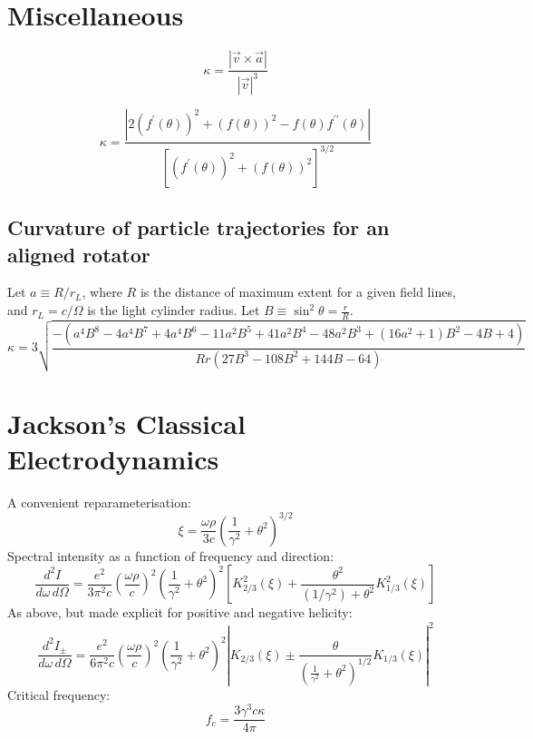 \documentclass[twocolumn]{article}
\begin{document}
\section{Miscellaneous}

\begin{equation}
    \kappa = \frac{|\vec{v}\times\vec{a}|}{|\vec{v}|^3}
\end{equation}

\begin{equation}
    \kappa = \frac{|2(f^\prime(\theta))^2 + (f(\theta))^2 - f(\theta)f^{\prime\prime}(\theta)|}{\left[(f^\prime(\theta))^2 + (f(\theta))^2\right]^{3/2}}
\end{equation}

\onecolumn

\subsection{Curvature of particle trajectories for an aligned rotator}

Let $a \equiv R/r_L$, where $R$ is the distance of maximum extent for a given field lines, and $r_L = c/\Omega$ is the light cylinder radius.
Let $B \equiv \sin^2\theta = \frac{r}{R}$.
\begin{equation}
    \kappa = 3\sqrt{
        \frac{-(a^4B^8 - 4a^4B^7 + 4a^4B^6 -
               11a^2B^5 + 41a^2B^4 - 48a^2B^3 +
               (16a^2+1)B^2 - 4B + 4)}{
                   Rr(27B^3 - 108B^2 + 144B - 64)}}
\end{equation}

\section{Jackson's Classical Electrodynamics}

A convenient reparameterisation:
\begin{equation}
    \xi = \frac{\omega\rho}{3c}\left(\frac{1}{\gamma^2} + \theta^2\right)^{3/2}
    \tag{J14.76}
\end{equation}
Spectral intensity as a function of frequency and direction:
\begin{equation}
    \frac{d^2I}{d\omega\,d\Omega} =
        \frac{e^2}{3\pi^2c}
        \left( \frac{\omega\rho}{c} \right)^2
        \left( \frac{1}{\gamma^2} + \theta^2 \right)^2
        \left[ K_{2/3}^2(\xi) + \frac{\theta^2}{(1/\gamma^2) + \theta^2} K_{1/3}^2(\xi) \right]
    \tag{J14.79}
\end{equation}
As above, but made explicit for positive and negative helicity:
\begin{equation}
    \frac{d^2I_\pm}{d\omega\,d\Omega} =
        \frac{e^2}{6\pi^2c}
        \left( \frac{\omega\rho}{c} \right)^2
        \left( \frac{1}{\gamma^2} + \theta^2 \right)^2
        \left| K_{2/3}(\xi) \pm \frac{\theta}{\left(\frac{1}{\gamma^2} + \theta^2\right)^{1/2}} K_{1/3}(\xi) \right|^2
    \tag{J Problem 14.25}
\end{equation}
Critical frequency:
\begin{equation}
    f_c = \frac{3\gamma^3 c\kappa}{4\pi}
    \tag{J14.81}
\end{equation}
\end{document}
